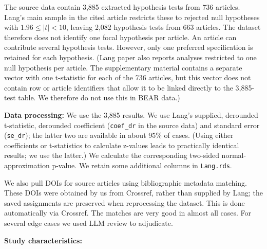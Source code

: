 \documentclass[
  11pt,
]{article}
\begin{document}
The source data contain 3,885 extracted hypothesis tests from 736
articles. Lang's main sample in the cited article restricts these to
rejected null hypotheses with \(1.96 \leq |t| < 10\), leaving 2,082
hypothesis tests from 663 articles. The dataset therefore does not
identify one focal hypothesis per article. An article can contribute
several hypothesis tests. However, only one preferred specification is
retained for each hypothesis. (Lang paper also reports analyses
restricted to one null hypothesis per article. The supplementary
material contains a separate vector with one t-statistic for each of the
736 articles, but this vector does not contain row or article
identifiers that allow it to be linked directly to the 3,885-test table.
We therefore do not use this in BEAR data.)

\textbf{Data processing:} We use the 3,885 results. We use Lang's
supplied, derounded t-statistic, derounded coefficient
(\texttt{coef\_dr} in the source data) and standard error
(\texttt{se\_dr}); the latter two are available in about 95\% of cases.
(Using either coefficients or t-statistics to calculate z-values leads
to practically identical results; we use the latter.) We calculate the
corresponding two-sided normal-approximation p-value. We retain some
additional columns in \texttt{Lang.rds}.

We also pull DOIs for source articles using bibliographic metadata
matching. These DOIs were obtained by us from Crossref, rather than
supplied by Lang; the saved assignments are preserved when reprocessing
the dataset. This is done automatically via Crossref. The matches are
very good in almost all cases. For several edge cases we used LLM review
to adjudicate.

\textbf{Study characteristics:}
\end{document}
